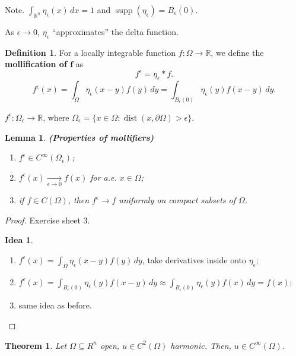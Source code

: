 \documentclass[12pt]{article}
\DeclareMathOperator{\supp}{supp}
\DeclareMathOperator{\dist}{dist}
\newtheorem{lemma}{Lemma}[section]
\newtheorem{theorem}{Theorem}[section]
\theoremstyle{definition}
\newtheorem*{definition*}{Definition}
\newtheorem*{idea}{Idea}
\begin{document}
Note. $\int_{\mathbb{R}^n}\eta_{\epsilon}(x)\,dx=1$ and $\supp(\eta_{\epsilon})=\overline{B_{\epsilon}(0)}$.

As $\epsilon\to0$, $\eta_{\epsilon}$ ``approximates'' the delta function.

\begin{definition*}
For a locally integrable function $f:\Omega\rightarrow\mathbb{R}$, we define the \textbf{mollification of $\boldsymbol{f}$} as
\[f^{\epsilon}=\eta_{\epsilon}*f.\]
\[f^{\epsilon}(x)=\int_{\Omega}\eta_{\epsilon}(x-y)f(y)\,dy=\int_{B_{\epsilon}(0)}\eta_{\epsilon}(y)f(x-y)\,dy.\]

$f^{\epsilon}:\Omega_{\epsilon}\rightarrow\mathbb{R}$, where $\Omega_{\epsilon}=\{x\in\Omega:\dist(x,\partial\Omega)>\epsilon\}$.
\end{definition*}

\begin{lemma}\label{properties_mollifier}
\emph{\textbf{(Properties of mollifiers)}}
\begin{enumerate}[label=(\roman*)]
\item\label{mollifier_differentiable} $f^{\epsilon}\in C^{\infty}(\Omega_{\epsilon})$;
\item\label{mollifier_conv_point} $f^{\epsilon}(x)\xrightarrow[\epsilon\to0]{}f(x)$ for a.e. $x\in\Omega$;
\item if $f\in C(\Omega)$, then $f^{\epsilon}\rightarrow f$ uniformly on compact subsets of $\Omega$.
\end{enumerate}
\end{lemma}

\begin{proof}
Exercise sheet 3.

\begin{idea}
\begin{enumerate}[label=(\roman*)]
\item $f^{\epsilon}(x)=\int_{\Omega}\eta_{\epsilon}(x-y)f(y)\,dy$, take derivatives inside onto $\eta_{\epsilon}$;
\item $f^{\epsilon}(x)=\int_{B_{\epsilon}(0)}\eta_{\epsilon}(y)f(x-y)\,dy\approx\int_{B_{\epsilon}(0)}\eta_{\epsilon}(y)f(x)\,dy=f(x)$;
\item same idea as before.
\end{enumerate}
\end{idea}
\end{proof}

\begin{theorem}\label{harmonic_infdiff}
Let $\Omega\subseteq R^n$ open, $u\in C^2(\Omega)$ harmonic. Then, $u\in C^{\infty}(\Omega)$.
\end{theorem}
\end{document}
